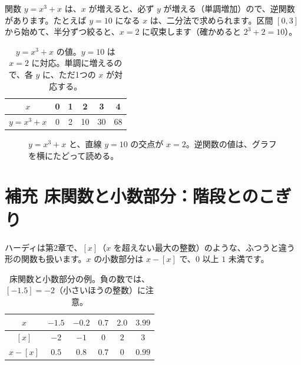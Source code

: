 \documentclass[a4paper,11pt,openany]{ltjsbook}
\begin{document}
関数 $y=x^3+x$ は、$x$ が増えると、必ず $y$ が増える（単調増加）ので、逆関数があります。たとえば $y=10$ になる $x$ は、二分法で求められます。区間 $[0,3]$ から始めて、半分ずつ絞ると、$x=2$ に収束します（確かめると $2^3+2=10$）。

\begin{table}[htbp]
\centering
\begin{tabular}{c|ccccc}
\toprule
$x$ & 0 & 1 & 2 & 3 & 4\\
\midrule
$y=x^3+x$ & 0 & 2 & 10 & 30 & 68\\
\bottomrule
\end{tabular}
\caption{$y=x^3+x$ の値。$y=10$ は $x=2$ に対応。単調に増えるので、各 $y$ に、ただ1つの $x$ が対応する。}
\end{table}

\begin{figure}[htbp]
\centering
{}
\caption{$y=x^3+x$ と、直線 $y=10$ の交点が $x=2$。逆関数の値は、グラフを横にたどって読める。}
\end{figure}

\section{補充 床関数と小数部分：階段とのこぎり}

ハーディは第2章で、$[x]$（$x$ を超えない最大の整数）のような、ふつうと違う形の関数も扱います。$x$ の小数部分は $x-[x]$ で、$0$ 以上 $1$ 未満です。

\begin{table}[htbp]
\centering
\begin{tabular}{c|ccccc}
\toprule
$x$ & $-1.5$ & $-0.2$ & $0.7$ & $2.0$ & $3.99$\\
\midrule
$[x]$ & $-2$ & $-1$ & $0$ & $2$ & $3$\\
$x-[x]$ & $0.5$ & $0.8$ & $0.7$ & $0$ & $0.99$\\
\bottomrule
\end{tabular}
\caption{床関数と小数部分の例。負の数では、$[-1.5]=-2$（小さいほうの整数）に注意。}
\end{table}
\end{document}
